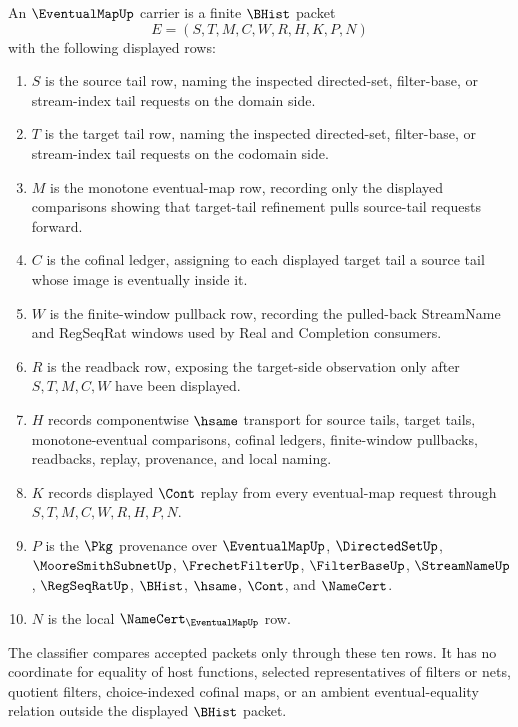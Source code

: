 \begin{definition}
\label{def:eventual-map-carrier}
An $\EventualMapUp$ carrier is a finite $\BHist$ packet
$$
E=(S,T,M,C,W,R,H,K,P,N)
$$
with the following displayed rows:
\begin{enumerate}
\item $S$ is the source tail row, naming the inspected directed-set, filter-base, or stream-index tail requests on the domain side.
\item $T$ is the target tail row, naming the inspected directed-set, filter-base, or stream-index tail requests on the codomain side.
\item $M$ is the monotone eventual-map row, recording only the displayed comparisons showing that target-tail refinement pulls source-tail requests forward.
\item $C$ is the cofinal ledger, assigning to each displayed target tail a source tail whose image is eventually inside it.
\item $W$ is the finite-window pullback row, recording the pulled-back StreamName and RegSeqRat windows used by Real and Completion consumers.
\item $R$ is the readback row, exposing the target-side observation only after $S,T,M,C,W$ have been displayed.
\item $H$ records componentwise $\hsame$ transport for source tails, target tails, monotone-eventual comparisons, cofinal ledgers, finite-window pullbacks, readbacks, replay, provenance, and local naming.
\item $K$ records displayed $\Cont$ replay from every eventual-map request through $S,T,M,C,W,R,H,P,N$.
\item $P$ is the $\Pkg$ provenance over $\EventualMapUp$, $\DirectedSetUp$, $\MooreSmithSubnetUp$, $\FrechetFilterUp$, $\FilterBaseUp$, $\StreamNameUp$, $\RegSeqRatUp$, $\BHist$, $\hsame$, $\Cont$, and $\NameCert$.
\item $N$ is the local $\NameCert_{\EventualMapUp}$ row.
\end{enumerate}
The classifier compares accepted packets only through these ten rows. It has no coordinate for equality of host functions, selected representatives of filters or nets, quotient filters, choice-indexed cofinal maps, or an ambient eventual-equality relation outside the displayed $\BHist$ packet.
\end{definition}

